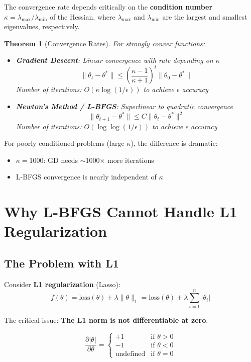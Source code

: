 \documentclass[11pt, a4paper, oneside]{article}
\newtheorem{theorem}{Theorem}
\begin{document}
The convergence rate depends critically on the \textbf{condition number} $\kappa = \lambda_{\max}/\lambda_{\min}$ of the Hessian, where $\lambda_{\max}$ and $\lambda_{\min}$ are the largest and smallest eigenvalues, respectively.

\begin{theorem}[Convergence Rates]
For strongly convex functions:
\begin{itemize}
    \item \textbf{Gradient Descent}: Linear convergence with rate depending on $\kappa$
    \[
    \|\theta_t - \theta^*\| \leq \left(\frac{\kappa - 1}{\kappa + 1}\right)^t \|\theta_0 - \theta^*\|
    \]
    Number of iterations: $O(\kappa \log(1/\epsilon))$ to achieve $\epsilon$ accuracy
    
    \item \textbf{Newton's Method / L-BFGS}: Superlinear to quadratic convergence
    \[
    \|\theta_{t+1} - \theta^*\| \leq C \|\theta_t - \theta^*\|^2
    \]
    Number of iterations: $O(\log \log(1/\epsilon))$ to achieve $\epsilon$ accuracy
\end{itemize}
\end{theorem}

For poorly conditioned problems (large $\kappa$), the difference is dramatic:
\begin{itemize}
    \item $\kappa = 1000$: GD needs $\sim$1000$\times$ more iterations
    \item L-BFGS convergence is nearly independent of $\kappa$
\end{itemize}

\section{Why L-BFGS Cannot Handle L1 Regularization}

\subsection{The Problem with L1}

Consider \textbf{L1 regularization} (Lasso):
\begin{equation}
f(\theta) = \text{loss}(\theta) + \lambda \|\theta\|_1 = \text{loss}(\theta) + \lambda \sum_{i=1}^n |\theta_i|
\end{equation}

The critical issue: \textbf{The L1 norm is not differentiable at zero}.

\begin{equation}
\frac{\partial |\theta|}{\partial \theta} = \begin{cases}
+1 & \text{if } \theta > 0 \\
-1 & \text{if } \theta < 0 \\
\text{undefined} & \text{if } \theta = 0
\end{cases}
\end{equation}
\end{document}
